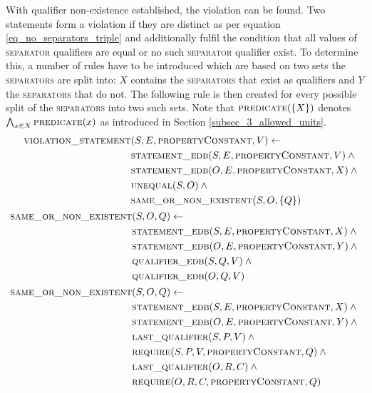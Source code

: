 \documentclass[hyperref,bachelorofscience,fleqn]{cgvpub}
\begin{document}
With qualifier non-existence established, the violation can be found. Two statements form a violation if they are distinct as per equation \ref{eq_no_separators_triple} and additionally fulfil the condition that all values of \textsc{separator} qualifiers are equal or no such \textsc{separator} qualifier exist. To determine this, a number of rules have to be introduced which are based on two sets the \textsc{separators} are split into: \(X\) contains the \textsc{separators} that exist as qualifiers and \(Y\) the \textsc{separators} that do not. The following rule is then created for every possible split of the \textsc{separators} into two such sets. Note that \(\textsc{predicate}(\{X\})\) denotes \(\bigwedge_{x \in X} \textsc{predicate}(x)\) as introduced in Section \ref{subsec_3_allowed_units}.
\begin{align}
\begin{split}
\textsc{violation\_statement}&(S, E, \textsc{propertyConstant}, V) \leftarrow \\
&\textsc{statement\_edb}(S, E, \textsc{propertyConstant}, V) \wedge{} \\
&\textsc{statement\_edb}(O, E, \textsc{propertyConstant}, X) \wedge{} \\
&\textsc{unequal}(S, O) \wedge{} \\
&\textsc{same\_or\_non\_existent}(S, O, \{Q\})
\end{split}\\
\begin{split}
\textsc{same\_or\_non\_existent}&(S, O, Q) \leftarrow \\
&\textsc{statement\_edb}(S, E, \textsc{propertyConstant}, X) \wedge{} \\
&\textsc{statement\_edb}(O, E, \textsc{propertyConstant}, Y) \wedge{} \\
&\textsc{qualifier\_edb}(S, Q, V) \wedge{} \\
&\textsc{qualifier\_edb}(O, Q, V)
\end{split}\\
\begin{split}
\textsc{same\_or\_non\_existent}&(S, O, Q) \leftarrow{} \\
&\textsc{statement\_edb}(S, E, \textsc{propertyConstant}, X) \wedge{} \\
&\textsc{statement\_edb}(O, E, \textsc{propertyConstant}, Y) \wedge{} \\
&\textsc{last\_qualifier}(S, P, V) \wedge{} \\
&\textsc{require}(S, P, V, \textsc{propertyConstant}, Q) \wedge{} \\
&\textsc{last\_qualifier}(O, R, C) \wedge{} \\
&\textsc{require}(O, R, C, \textsc{propertyConstant}, Q)
\end{split}
\end{align}
\end{document}
